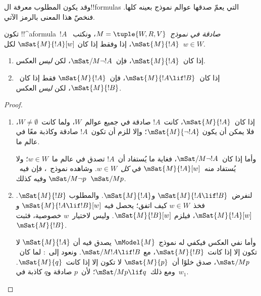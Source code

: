 \documentclass[../../../include/open-logic-section]{subfiles}
\begin{document}


وقد يكون المطلوب معرفة ال!!{formula}s التي يعمّ صدقها عوالم نموذج
بعينه كلها. فنخصّ هذا المعنى بالرمز الآتي.

\begin{defn}
  تكون !!^a{formula}~$!A$ \emph{صادقة في نموذج}~$M = \tuple{W, R,
    V}$، ونكتب~$\mSat{M}{!A}$، إذا وفقط إذا كان
  $\mSat{M}{!A}[w]$ لكل~$w \in W$.
\end{defn}

\begin{prop}
  \begin{enumerate}
  \item إذا كان~$\mSat{M}{!A}$، فإن~$\mSat/{M}{\lnot !A}$، لكن
    \emph{ليس} العكس.
  \item إذا كان~$\mSat{M}{!A \lif !B}$، فإن~$\mSat{M}{!A}$ فقط إذا
    كان~$\mSat{M}{!B}$، لكن \emph{ليس} العكس.
  \end{enumerate}
\end{prop}

\begin{proof}
  \begin{enumerate}
  \item إذا كان~$\mSat{M}{!A}$، كانت~$!A$ صادقة في جميع عوالم~$W$،
    ولما كانت~$W \neq \emptyset$، فلا يمكن أن يكون
    $\mSat{M}{\lnot!A}$؛ وإلا للزم أن تكون~$!A$ صادقة وكاذبة معًا في
    عالم ما.

    وأما إذا كان~$\mSat/{M}{\lnot !A}$، فغاية ما يُستفاد أن~$!A$
    تصدق في عالم ما~$w \in W$؛ ولا يُستفاد منه~$\mSat{M}{!A}[w]$
    في \emph{كل}~$w \in W$. وشاهده نموذج~،
    فإن فيه~$\mSat/{M}{\lnot p}$ وفيه كذلك~$\mSat/{M}{p}$.
  \item لنفرض~$\mSat{M}{!A \lif !B}$ و$\mSat{M}{!A}$. والمطلوب
    $\mSat{M}{!B}$. فخذ~$w \in W$ كيف اتفق؛ يحصل فيه
    $\mSat{M}{!A \lif !B}[w]$ و$\mSat{M}{!A}[w]$، فيلزم
    $\mSat{M}{!B}[w]$. وليس لاختيار~$w$ خصوصية، فثبت
    $\mSat{M}{!B}$.

    وأما نفي العكس فيكفي له نموذج~$\mModel{M}$ يصدق فيه أن
    $\mSat{M}{!A}$ لا تكون إلا إذا كانت~$\mSat{M}{!B}$، مع
    $\mSat/{M}{!A \lif !B}$. ونعود إلى~:
    لما كان~$\mSat/{M}{p}$، صدق خلوًا أن~$\mSat{M}{p}$ لا تكون
    إلا إذا كانت~$\mSat{M}{q}$. ومع ذلك~$\mSat/{M}{p \lif q}$؛
    لأن~$p$ صادقة و$q$ كاذبة في~$w_1$.
  \end{enumerate}
\end{proof}
\end{document}
